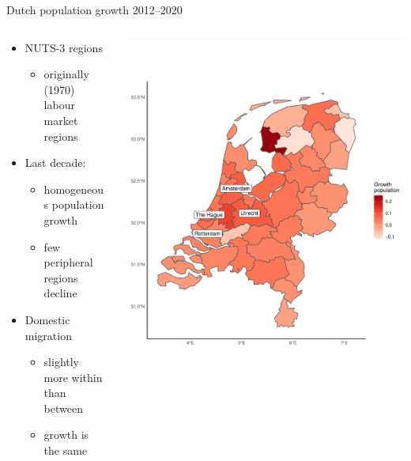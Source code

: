 \documentclass{beamer}
\begin{document}
\begin{frame}{Dutch population growth 2012--2020}
\begin{columns}
	\begin{column}{0.5\textwidth}
	\begin{itemize}
		\item NUTS-3 regions
		\begin{itemize}
			\item originally (1970) labour market regions \newline
		\end{itemize}
		\item Last decade:
		\begin{itemize}
			\item homogeneous population growth
			\item \alert{few} peripheral regions decline\newline
		\end{itemize}
		\item Domestic migration
			\begin{itemize}
				\item slightly more within than between 
				\item growth is the \alert{same}
			\end{itemize}
	\end{itemize}
	\end{column}
	\begin{column}{0.5\textwidth}
		\begin{center}
			\includegraphics[width=1\textwidth]{../../fig/growth_pop}
		\end{center}
	\end{column}
\end{columns}
\end{frame}
\end{document}
